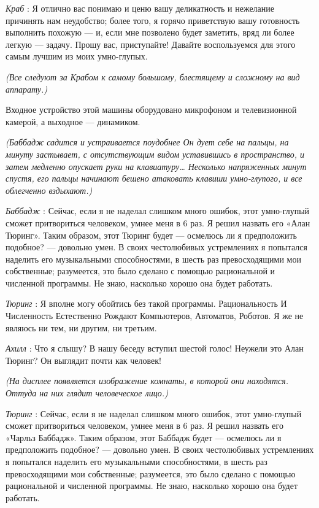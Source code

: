 \emph{Краб} : Я отлично вас понимаю и ценю вашу деликатность и нежелание причинять нам неудобство; более того, я горячо приветствую вашу готовность выполнить похожую --- и, если мне позволено будет заметить, вряд ли более легкую --- задачу. Прошу вас, приступайте! Давайте воспользуемся для этого самым лучшим из моих умно-глупых.

\emph{(Все следуют за Крабом к самому большому, блестящему и сложному на вид аппарату.)}

Входное устройство этой машины оборудовано микрофоном и телевизионной камерой, а выходное --- динамиком.

\emph{(Баббадж садится и устраивается поудобнее Он дует себе на пальцы, на минуту застывает, с отсутствующим видом уставившись в пространство, и затем медленно опускает руки на клавиатуру\ldots{} Несколько напряженных минут спустя, его пальцы начинают бешено атаковать клавиши умно-глупого, и все облегченно вздыхают.)}

\emph{Баббадж} : Сейчас, если я не наделал слишком много ошибок, этот умно-глупый сможет притвориться человеком, умнее меня в 6 раз. Я решил назвать его «Алан Тюринг». Таким образом, этот Тюринг будет --- осмелюсь ли я предположить подобное? --- довольно умен. В своих честолюбивых устремлениях я попытался наделить его музыкальными способностями, в шесть раз превосходящими мои собственные; разумеется, это было сделано с помощью рациональной и численной программы. Не знаю, насколько хорошо она будет работать.

\emph{Тюринг} : Я вполне могу обойтись без такой программы. Рациональность И Численность Естественно Рождают Компьютеров, Автоматов, Роботов. Я же не являюсь ни тем, ни другим, ни третьим.

\emph{Ахилл} : Что я слышу? В нашу беседу вступил шестой голос! Неужели это Алан Тюринг? Он выглядит почти как человек!

\emph{(На дисплее появляется изображение комнаты, в которой они находятся. Оттуда на них глядит человеческое лицо.)}

\emph{Тюринг} : Сейчас, если я не наделал слишком много ошибок, этот умно-глупый сможет притвориться человеком, умнее меня в 6 раз. Я решил назвать его «Чарльз Баббадж». Таким образом, этот Баббадж будет --- осмелюсь ли я предположить подобное? --- довольно умен. В своих честолюбивых устремлениях я попытался наделить его музыкальными способностями, в шесть раз превосходящими мои собственные; разумеется, это было сделано с помощью рациональной и численной программы. Не знаю, насколько хорошо она будет работать.

